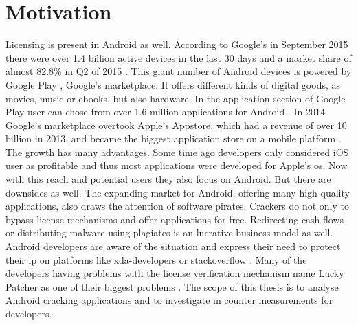 \section{Motivation}\label{section:introduction-motivation}
Licensing is present in Android as well.
According to Google's in September 2015 there were over 1.4 billion active devices in the last 30 days and a market share of almost 82.8\% in Q2 of 2015 \cite{androidDevices}\cite{androidShare}.
This giant number of Android devices is powered by Google Play \cite{googlePlay}, Google's marketplace.
It offers different kinds of digital goods, as movies, music or ebooks, but also hardware.
In the application section of Google Play user can chose from over 1.6 million applications for Android \cite{statistaAppStore}.
In 2014 Google's marketplace overtook Apple's Appstore, which had a revenue of over 10 billion in 2013, and became the biggest application store on a mobile platform \cite{wiwoValue}.
\newline
The growth has many advantages.
Some time ago developers only considered iOS user as profitable and thus most applications were developed for Apple's \gls{os}.
Now with this reach and potential users they also focus on Android\cite{businessProfit}.
But there are downsides as well.
The expanding market for Android, offering many high quality applications, also draws the attention of software pirates.
Crackers do not only to bypass license mechanisms and offer applications for free.
Redirecting cash flows or distributing malware using plagiates is an lucrative business model as well.
Android developers are aware of the situation \cite{developersPiracy} and express their need to protect their \gls{ip} on platforms like xda-developers \cite{xdaPiracy} or stackoverflow \cite{stackoverflowPiracy}.
Many of the developers having problems with the license verification mechanism name Lucky Patcher as one of their biggest problems \cite{stackoverflowLucky}.
\newline
\newline
The scope of this thesis is to analyse Android cracking applications and to investigate in counter measurements for developers.




